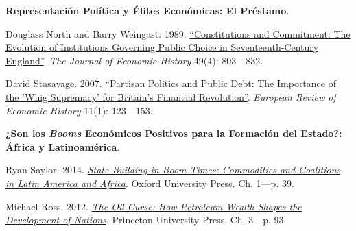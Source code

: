 \documentclass[letterpaper]{article}
\renewenvironment{itemize}{
  \begin{list}{}{
    \setlength{\leftmargin}{1.5em}
  }
}{
  \end{list}
}
\begin{document}
\begin{enumerate}[label=\roman*.]
\begin{itemize}
			\item[13.] {\bf Representaci\'on Pol\'itica y \'Elites Econ\'omicas: El Pr\'estamo}.
				\begin{itemize}
          			\item[$\circ$] Douglass North and Barry Weingast. 1989. \href{https://github.com/hbahamonde/Ciencia_Politica_II/raw/master/Readings/North_Weingast_1989.pdf}{``Constitutions and Commitment: The Evolution of Institutions Governing Public Choice in Seventeenth-Century England''}. \emph{The Journal of Economic History} 49(4): 803---832.
          			
                \item[$\circ$] David Stasavage. 2007. \href{https://github.com/hbahamonde/Ciencia_Politica_II/raw/master/Readings/Stasavage_2007.pdf}{``Partisan Politics and Public Debt: The Importance of the 'Whig Supremacy' for Britain's Financial Revolution''}. \emph{European Review of Economic History} 11(1): 123---153.
       			 \end{itemize}


      \item[14.] {\bf ¿Son los \emph{Booms} Econ\'omicos Positivos para la Formaci\'on del Estado?: \'Africa y Latinoam\'erica}.
        \begin{itemize}
          \item[$\circ$] Ryan Saylor. 2014. \href{https://github.com/hbahamonde/Ciencia_Politica_II/raw/master/Readings/Saylor.pdf}{\emph{State Building in Boom Times: Commodities and Coalitions in Latin America and Africa}}. Oxford University Press. Ch. 1---p. 39.
          
          \item[$\circ$] Michael Ross. 2012. \href{https://github.com/hbahamonde/Ciencia_Politica_II/raw/master/Readings/Ross_2012.epub}{\emph{The Oil Curse: How Petroleum Wealth Shapes the Development of Nations}}. Princeton University Press. Ch. 3---p. 93.
        \end{itemize}


\end{itemize}
\end{enumerate}
\end{document}
